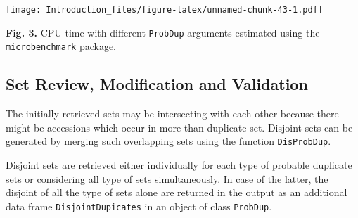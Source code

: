 \documentclass[]{article}
\newenvironment{Shaded}{\begin{snugshade}}{\end{snugshade}}
\newcommand{\CharTok}[1]{\textcolor[rgb]{0.31,0.60,0.02}{#1}}
\newcommand{\DataTypeTok}[1]{\textcolor[rgb]{0.13,0.29,0.53}{#1}}
\newcommand{\FloatTok}[1]{\textcolor[rgb]{0.00,0.00,0.81}{#1}}
\newcommand{\KeywordTok}[1]{\textcolor[rgb]{0.13,0.29,0.53}{\textbf{#1}}}
\newcommand{\NormalTok}[1]{#1}
\newcommand{\StringTok}[1]{\textcolor[rgb]{0.31,0.60,0.02}{#1}}
\begin{document}
\begin{Shaded}
\end{Shaded}

\texttt{[image: Introduction\_files/figure-latex/unnamed-chunk-43-1.pdf]}

\textbf{Fig. 3.} CPU time with different \texttt{ProbDup} arguments
estimated using the \texttt{microbenchmark} package.

\hypertarget{set-review-modification-and-validation}{%
\subsection{Set Review, Modification and
Validation}\label{set-review-modification-and-validation}}

The initially retrieved sets may be intersecting with each other because
there might be accessions which occur in more than duplicate set.
Disjoint sets can be generated by merging such overlapping sets using
the function \texttt{DisProbDup}.

Disjoint sets are retrieved either individually for each type of
probable duplicate sets or considering all type of sets simultaneously.
In case of the latter, the disjoint of all the type of sets alone are
returned in the output as an additional data frame
\texttt{DisjointDupicates} in an object of class \texttt{ProbDup}.
\end{document}

